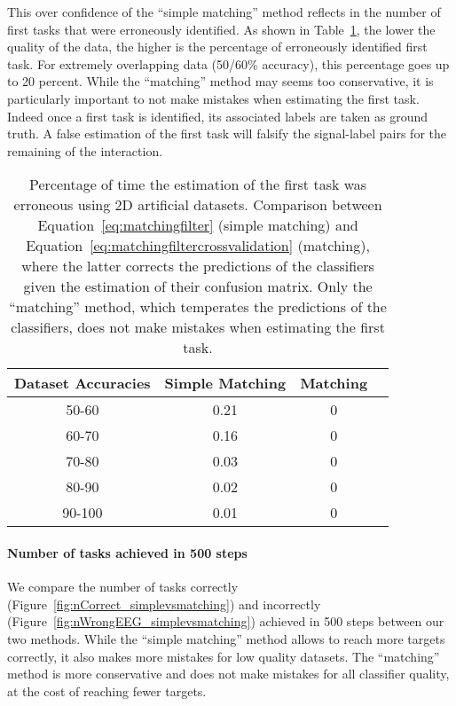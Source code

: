 This over confidence of the ``simple matching'' method reflects in the number of first tasks that were erroneously identified. As shown in Table~\ref{tab:errorTaskRatiosimplevsmatching}, the lower the quality of the data, the higher is the percentage of erroneously identified first task. For extremely overlapping data (50/60\% accuracy), this percentage goes up to 20 percent. While the ``matching'' method may seems too conservative, it is particularly important to not make mistakes when estimating the first task. Indeed once a first task is identified, its associated labels are taken as ground truth. A false estimation of the first task will falsify the signal-label pairs for the remaining of the interaction.

\begin{table}[!htbp]
\centering
{}
\begin{tabular}{c c c c}
    Dataset Accuracies & Simple Matching &  Matching \\ \hline
    50-60 & 0.21 & 0 \\ 
    60-70 & 0.16 & 0 \\
    70-80 & 0.03 & 0 \\
    80-90 & 0.02 & 0 \\
    90-100 & 0.01 & 0 \\
\end{tabular}
\caption{Percentage of time the estimation of the first task was erroneous using 2D artificial datasets. Comparison between Equation~\ref{eq:matchingfilter} (simple matching) and Equation~\ref{eq:matchingfiltercrossvalidation} (matching), where the latter corrects the predictions of the classifiers given the estimation of their confusion matrix. Only the ``matching'' method, which temperates the predictions of the classifiers, does not make mistakes when estimating the first task.}
\label{tab:errorTaskRatiosimplevsmatching}
\end{table}

\paragraph{Number of tasks achieved in 500 steps}

We compare the number of tasks correctly (Figure~\ref{fig:nCorrect_simplevsmatching}) and incorrectly (Figure~\ref{fig:nWrongEEG_simplevsmatching}) achieved in 500 steps between our two methods. While the ``simple matching'' method allows to reach more targets correctly, it also makes more mistakes for low quality datasets. The ``matching'' method is more conservative and does not make mistakes for all classifier quality, at the cost of reaching fewer targets.

